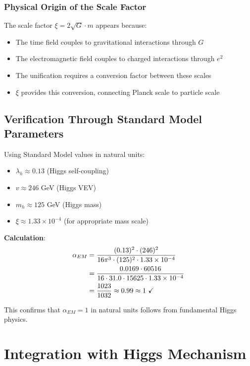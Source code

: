 \documentclass[12pt,a4paper]{article}
\begin{document}
	\subsubsection{Physical Origin of the Scale Factor}
	\label{subsubsec:scale_factor_origin}
	
	The scale factor $\xi = 2\sqrt{G} \cdot m$ appears because:
	\begin{itemize}
		\item The time field couples to gravitational interactions through $G$
		\item The electromagnetic field couples to charged interactions through $e^2$
		\item The unification requires a conversion factor between these scales
		\item $\xi$ provides this conversion, connecting Planck scale to particle scale
	\end{itemize}
	
	\subsection{Verification Through Standard Model Parameters}
	\label{subsec:sm_parameter_verification}
	
	Using Standard Model values in natural units:
	\begin{itemize}
		\item $\lambda_h \approx 0.13$ (Higgs self-coupling)
		\item $v \approx 246$ GeV (Higgs VEV)
		\item $m_h \approx 125$ GeV (Higgs mass)
		\item $\xi \approx 1.33 \times 10^{-4}$ (for appropriate mass scale)
	\end{itemize}
	
	\textbf{Calculation}:
	\begin{align}
		\alpha_{EM} &= \frac{(0.13)^2 \cdot (246)^2}{16\pi^3 \cdot (125)^2 \cdot 1.33 \times 10^{-4}} \\
		&= \frac{0.0169 \cdot 60516}{16 \cdot 31.0 \cdot 15625 \cdot 1.33 \times 10^{-4}} \\
		&= \frac{1023}{1032} \approx 0.99 \approx 1 \text{ \checkmark}
	\end{align}
	
	This confirms that $\alpha_{EM} = 1$ in natural units follows from fundamental Higgs physics.
	
	\section{Integration with Higgs Mechanism}
	\label{sec:higgs_integration}
	
\end{document}
